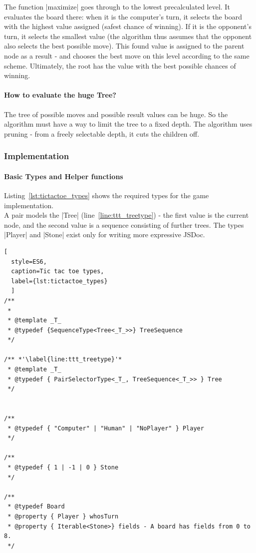 The function |maximize| goes through to the lowest precalculated level. It
evaluates the board there: when it is the computer's turn, it selects the board with
the highest value assigned (safest chance of winning). If it is the opponent's
turn, it selects the smallest value (the algorithm thus assumes that the
opponent also selects the best possible move). This found value is assigned to
the parent node as a result - and chooses the best move on this level according
to the same scheme. Ultimately, the root has the value with the best possible
chances of winning.

\paragraph{How to evaluate the huge Tree?} The tree of possible moves and possible
result values can be huge. So the algorithm must have a way to limit the tree
to a fixed depth. The algorithm uses pruning - from a freely selectable depth,
it cuts the children off. 

\subsubsection{Implementation}
\label{subsub:alphabeta_implementation}
\paragraph{Basic Types and Helper functions} 
Listing~\ref{lst:tictactoe_types} shows the required types for the game
implementation. \\
A pair models the |Tree| (line~\ref{line:ttt_treetype}) - the first
value is the current node, and the second value is a sequence consisting of
further trees. The types |Player| and |Stone| exist only for writing more
expressive JSDoc.

\begin{lstlisting}[
  style=ES6, 
  caption=Tic tac toe types,
  label={lst:tictactoe_types}
  ]
/**
 * 
 * @template _T_
 * @typedef {SequenceType<Tree<_T_>>} TreeSequence
 */

/** *'\label{line:ttt_treetype}'*
 * @template _T_
 * @typedef { PairSelectorType<_T_, TreeSequence<_T_>> } Tree
 */


/**
 * @typedef { "Computer" | "Human" | "NoPlayer" } Player
 */

/**
 * @typedef { 1 | -1 | 0 } Stone
 */

/**
 * @typedef Board
 * @property { Player } whosTurn
 * @property { Iterable<Stone>} fields - A board has fields from 0 to 8.
 */
\end{lstlisting}

